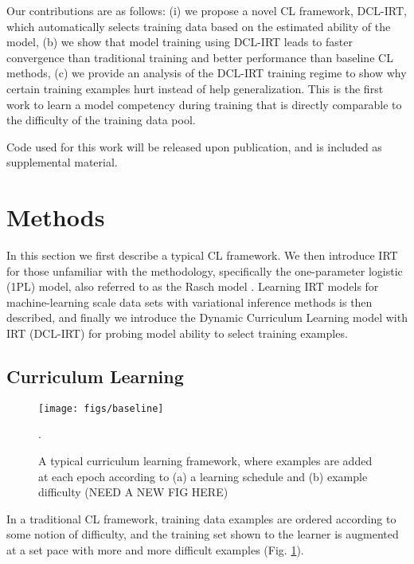 \documentclass[letterpaper]{article} %
\begin{document}
Our contributions are as follows: (i) we propose a novel CL framework, DCL-IRT, which automatically selects training data based on the estimated ability of the model, (b) we show that model training using DCL-IRT leads to faster convergence than traditional training and better performance than baseline CL methods, (c) we provide an analysis of the DCL-IRT training regime to show why certain training examples hurt instead of help generalization.
This is the first work to learn a model competency during training that is directly comparable to the difficulty of the training data pool.

Code used for this work will be released upon publication, and is included as supplemental material.

\section{Methods}

In this section we first describe a typical CL framework.
We then introduce IRT for those unfamiliar with the methodology, specifically the one-parameter logistic (1PL) model, also referred to as the Rasch model \cite{rasch_studies_1960,baker_item_2004}.
Learning IRT models for machine-learning scale data sets with variational inference methods is then described, and finally we introduce the Dynamic Curriculum Learning model with IRT (DCL-IRT) for probing model ability to select training examples.

\subsection{Curriculum Learning}
\begin{figure}[ht]
	\centering 
	\texttt{[image: figs/baseline]}
	\caption{A typical curriculum learning framework, where examples are added at each epoch according to (a) a learning schedule and (b) example difficulty (NEED A NEW FIG HERE)}.
	\label{fig:cl_framework} 
\end{figure}


In a traditional CL framework, training data examples are ordered according to some notion of difficulty, and the training set shown to the learner is augmented at a set pace with more and more difficult examples (Fig. \ref{fig:cl_framework}).
\end{document}
